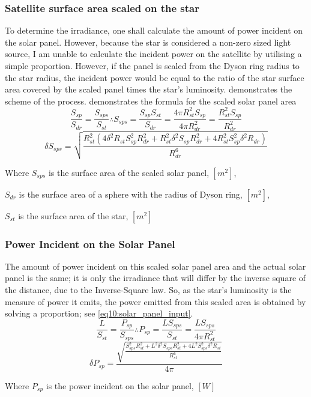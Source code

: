 \documentclass[stu, 11pt, a4paper, floatsintext]{apa7}
\begin{document}
	\subsubsection{Satellite surface area scaled on the star}
	To determine the irradiance, one shall calculate the amount of power incident on the solar panel. However, because the star is considered a non-zero sized light source, I am unable to calculate the incident power on the satellite by utilising a simple proportion. However, if the panel is scaled from the Dyson ring radius to the star radius, the incident power would be equal to the ratio of the star surface area covered by the scaled panel times the star's luminosity.  demonstrates the scheme of the process.  demonstrates the formula for the scaled solar panel area
	\begin{equation}
		\label{eq9:solar_panel_area_scaled}
		\frac{S_{sp}}{S_{dr}} = \frac{S_{sps}}{S_{st}} \therefore S_{sps} = \frac{S_{sp}S_{st}}{S_{dr}} = \frac{4\pi R^2_{st}S_{sp}}{4\pi R^2_{dr}}=\frac{R^2_{st}S_{sp}}{R^2_{dr}}
	\end{equation}
	\begin{equation*}
		\delta S_{sps}=\sqrt{\frac{R_{st}^2\left(4\delta^2R_{st}S_{sp}^2R_{dr}^2+R_{st}^2\delta^2S_{sp}R_{dr}^2+4R_{st}^2S_{sp}^2\delta^2R_{dr}\right)}{R_{dr}^6}}
	\end{equation*}
	\begin{center}
		Where $S_{sps}$ is the surface area of the scaled solar panel, $[m^2]$,
		
		$S_{dr}$ is the surface area of a sphere with the radius of Dyson ring, $[m^2]$,
		
		$S_{st}$ is the surface area of the star, $[m^2]$
	\end{center}
	\subsubsection{Power Incident on the Solar Panel}
	The amount of power incident on this scaled solar panel area and the actual solar panel is the same; it is only the irradiance that will differ by the inverse square of the distance, due to the Inverse-Square law. So, as the star's luminosity is the measure of power it emits, the power emitted from this scaled area is obtained by solving a proportion; see \cref{eq10:solar_panel_input}.
	\begin{equation}
		\label{eq10:solar_panel_input}
		\frac{L}{S_{st}} = \frac{P_{sp}}{S_{sps}} \therefore P_{sp} = \frac{LS_{sps}}{S_{st}}=\frac{LS_{sps}}{4\pi R_{st}^2}
	\end{equation}
	\begin{equation*}
		\delta P_{sp}=\frac{\sqrt{\frac{S_{sps}^2R_{st}^2 + L^2\delta^2S_{sps}R_{st}^2+4L^2S_{sps}^2\delta^2R_{st}}{R_{st}^6}}}{4\pi}
	\end{equation*}
	\begin{center}
		Where $P_{sp}$ is the power incident on the solar panel, $[W]$
	\end{center}
\end{document}
